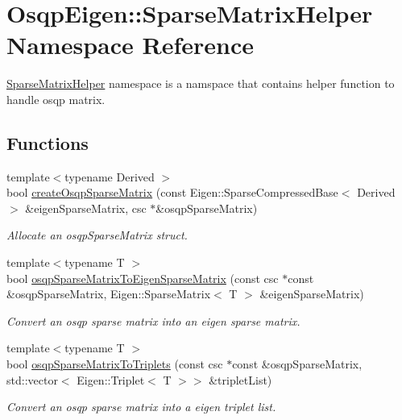 \section{Osqp\+Eigen\+:\+:Sparse\+Matrix\+Helper Namespace Reference}
\label{namespaceOsqpEigen_1_1SparseMatrixHelper}


\mbox{\hyperlink{namespaceOsqpEigen_1_1SparseMatrixHelper}{Sparse\+Matrix\+Helper}} namespace is a namspace that contains helper function to handle osqp matrix.  


\subsection*{Functions}
\begin{DoxyCompactItemize}
\item 
{\footnotesize template$<$typename Derived $>$ }\\bool \mbox{\hyperlink{namespaceOsqpEigen_1_1SparseMatrixHelper_a84479192d86e344f029d072a62c8217b}{create\+Osqp\+Sparse\+Matrix}} (const Eigen\+::\+Sparse\+Compressed\+Base$<$ Derived $>$ \&eigen\+Sparse\+Matrix, csc $\ast$\&osqp\+Sparse\+Matrix)
\begin{DoxyCompactList}\small\item\em Allocate an osqp\+Sparse\+Matrix struct. \end{DoxyCompactList}\item 
{\footnotesize template$<$typename T $>$ }\\bool \mbox{\hyperlink{namespaceOsqpEigen_1_1SparseMatrixHelper_aec1a2210ce843eda8e4000c81d886131}{osqp\+Sparse\+Matrix\+To\+Eigen\+Sparse\+Matrix}} (const csc $\ast$const \&osqp\+Sparse\+Matrix, Eigen\+::\+Sparse\+Matrix$<$ T $>$ \&eigen\+Sparse\+Matrix)
\begin{DoxyCompactList}\small\item\em Convert an osqp sparse matrix into an eigen sparse matrix. \end{DoxyCompactList}\item 
{\footnotesize template$<$typename T $>$ }\\bool \mbox{\hyperlink{namespaceOsqpEigen_1_1SparseMatrixHelper_af45a1d77519f691542150e506b6dcdeb}{osqp\+Sparse\+Matrix\+To\+Triplets}} (const csc $\ast$const \&osqp\+Sparse\+Matrix, std\+::vector$<$ Eigen\+::\+Triplet$<$ T $>$$>$ \&triplet\+List)
\begin{DoxyCompactList}\small\item\em Convert an osqp sparse matrix into a eigen triplet list. \end{DoxyCompactList}\item 
$$
\end{DoxyCompactItemize}
